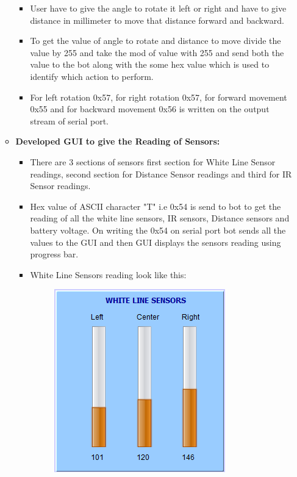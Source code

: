 \documentclass{article}
\begin{document}
\begin{enumerate}
\begin{itemize}
\begin{itemize}
\begin{figure}[h]
\begin{center}
					\end{center}
				\end{figure} 
				\item User have to give the angle to rotate it left or right and have to give distance in millimeter to move that distance forward and backward.
				\item To get the value of angle to rotate and distance to move divide the value by 255 and take the mod of value with 255 and send both the value to the bot along with the some hex value which is used to identify which action to perform.
				\item For left rotation 0x57, for right rotation 0x57, for forward movement 0x55 and for backward movement 0x56 is written on the output stream of serial port.
			\end{itemize}   
			\item \textbf{Developed GUI to give the Reading of Sensors: } 
			\begin{itemize}
				\item There are 3 sections of sensors first section for White Line Sensor readings, second section for Distance Sensor readings and third for IR Sensor readings.
				\item  Hex value of ASCII character "T" i.e 0x54 is send to bot to get the reading of all the white line sensors, IR sensors, Distance sensors and battery voltage. On writing the 0x54 on serial port bot sends all the values to the GUI and then GUI displays the sensors reading  using progress bar.
				\item White Line Sensors reading look like this: \\
				\begin{figure}[h]
					\begin{center}
						\includegraphics[scale=1]{whitelinesensor.png}

\end{center}
\end{figure}
\end{itemize}
\end{itemize}
\end{enumerate}
\end{document}
